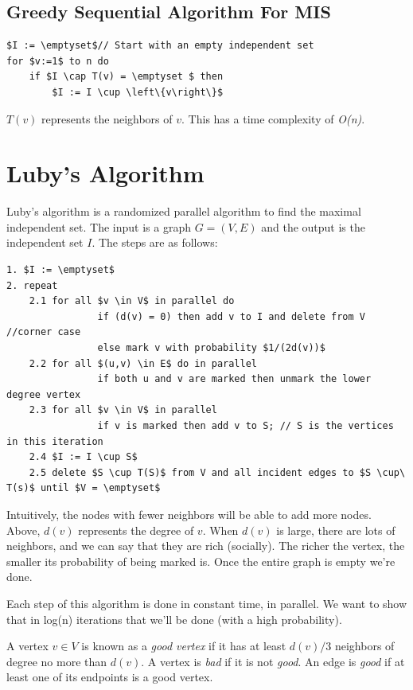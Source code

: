 \documentclass[twoside]{article}
\begin{document}
\clearpage
\subsection{Greedy Sequential Algorithm For MIS}

\begin{lstlisting}[mathescape=true]
$I := \emptyset$// Start with an empty independent set
for $v:=1$ to n do
	if $I \cap T(v) = \emptyset $ then
    	$I := I \cup \left\{v\right\}$
\end{lstlisting}

$T(v)$ represents the neighbors of $v$. This has a time complexity of \textit{O(n)}. 

\section{Luby's Algorithm}
Luby's algorithm is a randomized parallel algorithm to find the maximal independent set.  The input is a graph $G = (V, E)$ and the output is the independent set $I$.  The steps are as follows:

\begin{lstlisting}[mathescape=true,numbers=none]
1. $I := \emptyset$
2. repeat
	2.1 for all $v \in V$ in parallel do
				if (d(v) = 0) then add v to I and delete from V   //corner case
				else mark v with probability $1/(2d(v))$
 	2.2 for all $(u,v) \in E$ do in parallel
    			if both u and v are marked then unmark the lower degree vertex
 	2.3 for all $v \in V$ in parallel
    			if v is marked then add v to S; // S is the vertices in this iteration
	2.4 $I := I \cup S$  
	2.5 delete $S \cup T(S)$ from V and all incident edges to $S \cup\ T(s)$ until $V = \emptyset$
\end{lstlisting}

Intuitively, the nodes with fewer neighbors will be able to add more nodes.  Above, $d(v)$ represents the degree of $v$. When $d(v)$ is large, there are lots of neighbors, and we can say that they are rich (socially).  The richer the vertex, the smaller its probability of being marked is.  Once the entire graph is empty we're done.

Each step of this algorithm is done in constant time, in parallel.  We want to show that in log(n) iterations that we'll be done (with a high probability).

A vertex $v \in V$ is known as a \textit{good vertex} if it has at least $d(v)/3$ neighbors of degree no more than $d(v)$.  A vertex is \textit{bad} if it is not \textit{good}.  An edge is \textit{good} if at least one of its endpoints is a good vertex.
\end{document}
